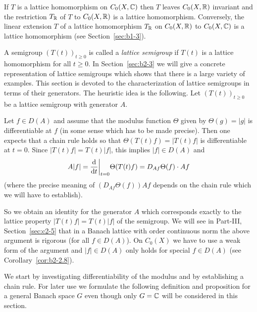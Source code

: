 \begin{remark}\label{rem:b2-2.1}
If\/ $T$ is a lattice homomorphism on $C_{0}(X,\mathbb{C})$ then $T$ leaves $C_{0}(X,\mathbb{R})$ invariant and the restriction $T_{\mathbb{R}}$ of\/ $T$ to $C_{0}(X,\mathbb{R})$ is a lattice homomorphism.
Conversely, the linear extension $T$ of a lattice homomorphism $T_{\mathbb{R}}$ on $C_{0}(X,\mathbb{R})$ to $C_{0}(X,\mathbb{C})$ is a lattice homomorphism (see Section~\ref{sec:b1-3}).
\end{remark}

A semigroup $(T(t))_{t \geq 0}$ is called a \emph{lattice semigroup} if\/ $T(t)$ is a lattice homomorphism for all $t \geq 0$.
In Section~\ref{sec:b2-3} we will give a concrete representation of lattice semigroups which shows that there is a large variety of examples.
This section is devoted to the characterization of lattice semigroups in terms of their generators.
The heuristic idea is the following.
Let $(T(t))_{t \geq 0}$ be a lattice semigroup with generator $A$.

Let $f \in D(A)$ and assume that the modulus function $\Theta$ given by $\Theta(g) = |g|$ is differentiable at $f$ (in some sense which has to be made precise).
Then one expects that a chain rule holds so that $\Theta(T(t)f) = |T(t)f|$ is differentiable at $t = 0$.
Since $|T(t)f| = T(t)|f|$, this implies $|f| \in D(A)$ and 
\[
A|f| = \frac{\mathop{}\!\mathrm{d}{}}{\mathop{}\!\mathrm{d}{t}}\bigg|_{t=0} \Theta(T(t)f)
     = D_{Af}\Theta(f) \cdot Af
\]
 (where the precise meaning of\/ $(D_{Af}\Theta(f))Af$  
 depends on the chain rule which we will have to establish).
 
So we obtain an identity for the generator $A$ which corresponds exactly to the lattice property $|T(t)f| = T(t)|f|$ of the semigroup.
We will see in Part-III, Section~\ref{sec:c2-5} that in a Banach lattice with order continuous norm the above argument is rigorous (for all $f \in D(A)$).
On $C_{0}(X)$ we have to use a weak form of the argument and $|f| \in D(A)$ only holds for special $f \in D(A)$ (see Corollary~\ref{cor:b2-2.8}).

We start by investigating differentiability of the modulus and by establishing a chain rule.
For later use we formulate the following definition and proposition for a general Banach space $G$ even though only $G = \mathbb{C}$ will be considered in this section.

